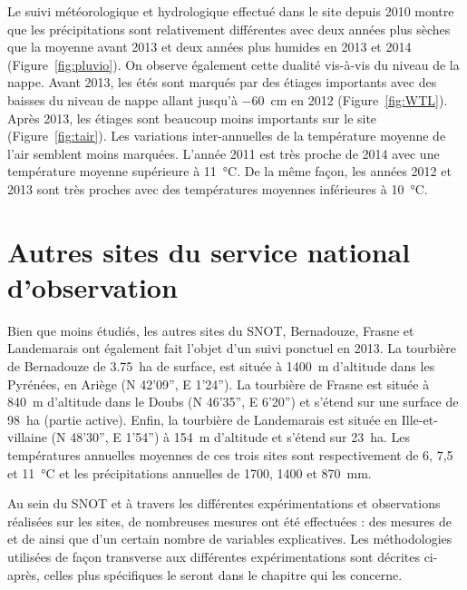 Le suivi météorologique et hydrologique effectué dans le site depuis 2010 montre que les précipitations sont relativement différentes avec deux années plus sèches que la moyenne avant 2013 et deux années plus humides en 2013 et 2014 (Figure~\ref{fig:pluvio}).
On observe également cette dualité vis-à-vis du niveau de la nappe.
Avant 2013, les étés sont marqués par des étiages importants avec des baisses du niveau de nappe allant jusqu'à \SI{-60}{\cm} en 2012 (Figure~\ref{fig:WTL}).
Après 2013, les étiages sont beaucoup moins importants sur le site (Figure~\ref{fig:tair}).
Les variations inter-annuelles de la température moyenne de l'air semblent moins marquées.
L'année 2011 est très proche de 2014 avec une température moyenne supérieure à \SI{11}{\degreeCelsius}.
De la même façon, les années 2012 et 2013 sont très proches avec des températures moyennes inférieures à  \SI{10}{\degreeCelsius}.

\singlespacing
\section{Autres sites du service national d'observation}
\doublespacing

Bien que moins étudiés, les autres sites du SNOT, Bernadouze, Frasne et Landemarais ont également fait l'objet d'un suivi ponctuel en 2013.
La tourbière de Bernadouze de \SI{3.75}{\hectare} de surface, est située à \SI{1400}{\metre} d'altitude dans les Pyrénées, en Ariège (N 42’09”, E 1’24”).
La tourbière de Frasne est située à \SI{840}{\metre} d'altitude dans le Doubs (N 46’35”, E 6’20”) et s'étend sur une surface de \SI{98}{\hectare} (partie active).
Enfin, la tourbière de Landemarais est située en Ille-et-villaine (N 48’30”, E 1’54”) à \SI{154}{\metre} d'altitude et s'étend sur \SI{23}{\hectare}.
Les températures annuelles moyennes de ces trois sites sont respectivement de 6, 7,5 et \SI{11}{\degreeCelsius} et les précipitations annuelles de \num{1700}, \num{1400} et \SI{870}{\milli\meter}.

Au sein du SNOT et à travers les différentes expérimentations et observations réalisées sur les sites, de nombreuses mesures ont été effectuées : des mesures de \coo et de \chh ainsi que d'un certain nombre de variables explicatives.
Les méthodologies utilisées de façon transverse aux différentes expérimentations sont décrites ci-après, celles plus spécifiques le seront dans le chapitre qui les concerne.


